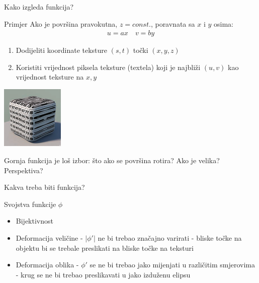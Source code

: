 \documentclass[9pt]{beamer}
\begin{document}
\begin{frame}{Kako izgleda funkcija?}
	\begin{block}{Primjer}
		Ako je površina pravokutna, $z=const.$, poravnata sa $x$ i $y$ osima: 
		\begin{align*}
		u = ax \quad v = by
		\end{align*}
	\end{block}
	\begin{enumerate}
		\item Dodijeliti koordinate teksture $(s, t)$ točki $(x,y,z)$
		\item Koristiti vrijednost piksela teksture (textela) koji je najbliži $(u, v)$ kao vrijednost teksture na $x, y$
	\end{enumerate}
	
	\begin{center}
		\includegraphics[width=3cm]{slike/planar_proj.png}
	\end{center}
	Gornja funkcija je loš izbor: što ako se površina rotira? Ako je velika? Perspektiva?
\end{frame}

\begin{frame}{Kakva treba biti funkcija?}
	\begin{block}{Svojstva funkcije $\phi$}
		\begin{itemize}
			\item Bijektivnost
			\item Deformacija veličine - $|\phi'|$ ne bi trebao značajno varirati - bliske točke na objektu bi se trebale preslikati na bliske točke na teksturi
			\item Deformacija oblika - $\phi'$ se ne bi trebao jako mijenjati u različitim smjerovima - krug se ne bi trebao preslikavati u jako izduženu elipsu
		\end{itemize}
	\end{block}
\end{frame}
\end{document}
